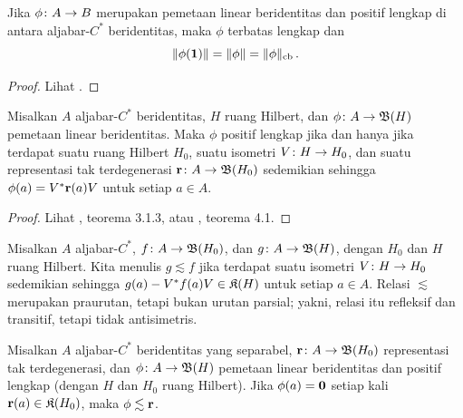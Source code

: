\begin{prop}\label{00582921} Jika $\phi\colon A \rightarrow B$ merupakan pemetaan linear beridentitas dan positif lengkap
di antara aljabar-$C^*$ beridentitas, maka $\phi$ terbatas lengkap dan
   \[ \lVert\phi(\mathbf{1})\rVert = \lVert\phi\rVert = \lVert\phi\rVert_{\mathrm{cb}}\,. \]
\end{prop}

\begin{proof} Lihat \cite{Paulsen:2002}. \ns \end{proof}

\begin{thm}\label{005831} Misalkan $A$ aljabar-$C^*$ beridentitas,
$H$ ruang Hilbert, dan $\phi\colon A \rightarrow \mathfrak{B}(H)$ pemetaan linear beridentitas.
Maka $\phi$ positif lengkap jika dan hanya jika terdapat suatu ruang Hilbert
$H_0$, suatu isometri $V\colon H \rightarrow H_0$, dan suatu representasi tak terdegenerasi $\mathbf{r}\colon A \rightarrow \mathfrak{B}(H_0)$ sedemikian sehingga $\phi(a) = V^*\mathbf{r}(a)V$ untuk setiap $a \in A$.
\end{thm}

\begin{proof} Lihat \cite{HigsonR:2000}, teorema 3.1.3, atau \cite{Paulsen:2002}, teorema 4.1. \ns
\end{proof}

\begin{notn} Misalkan $A$ aljabar-$C^*$, $f\colon A \rightarrow \mathfrak{B}(H_0)$, dan
$g\colon A \rightarrow \mathfrak{B}(H)$, dengan $H_0$ dan $H$ ruang Hilbert. Kita menulis
$g \lesssim f$ jika terdapat suatu isometri $V\colon H \rightarrow H_0$ sedemikian sehingga $g(a) -
V^*f(a)V \in \mathfrak{K}(H)$ untuk setiap $a \in A$. Relasi $\lesssim$ merupakan praurutan,
tetapi bukan urutan parsial; yakni, relasi itu refleksif dan transitif, tetapi tidak
antisimetris.
\end{notn}

\begin{thm}[Voiculescu]\label{0058335} Misalkan $A$ aljabar-$C^*$ beridentitas yang separabel,
$\mathbf{r}\colon A \rightarrow \mathfrak{B}(H_0)$ representasi tak terdegenerasi, dan
$\phi\colon A \rightarrow \mathfrak{B}(H)$ pemetaan linear beridentitas dan positif lengkap (dengan $H$ dan $H_0$ ruang Hilbert). Jika $\phi(a) =
\mathbf{0}$ setiap kali $\mathbf{r}(a) \in \mathfrak{K}(H_0)$, maka $\phi \lesssim \mathbf{r}$.
\end{thm}

